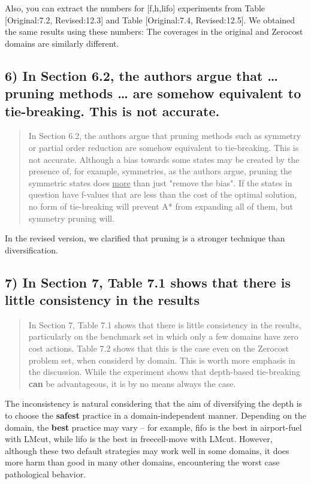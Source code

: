 \documentclass{article}
\begin{document}
Also, you can extract the numbers for [f,h,lifo] experiments from
Table [Original:7.2, Revised:12.3] and Table [Original:7.4, Revised:12.5].
We obtained the same results using these numbers:
The coverages in the original and Zerocost domains are similarly different.

\subsection{6) In Section 6.2, the authors argue that \ldots{} pruning methods \ldots{} are somehow equivalent to tie-breaking. This is not accurate.}
\label{sec:orgheadline31}

\begin{quote}
 In Section 6.2, the authors argue that pruning methods such as
symmetry or partial order reduction are somehow equivalent to
tie-breaking. This is not accurate. Although a bias towards some
states may be created by the presence of, for example, symmetries, as
the authors argue, pruning the symmetric states does \underline{more} than just
"remove the bias". If the states in question have f-values that are
less than the cost of the optimal solution, no form of tie-breaking
will prevent A* from expanding all of them, but symmetry pruning will.
\end{quote}

In the revised version, we clarified that pruning is a stronger technique
than diversification.

\subsection{7) In Section 7, Table 7.1 shows that there is little consistency in the results}
\label{sec:orgheadline32}

\begin{quote}
 In Section 7, Table 7.1 shows that there is little consistency in the
results, particularly on the benchmark set in which only a few domains
have zero cost actions. Table 7.2 shows that this is the case even on
the Zerocost problem set, when considerd by domain. This is worth more
emphasis in the discussion. While the experiment shows that
depth-based tie-breaking \textbf{can} be advantageous, it is by no means
always the case.
\end{quote}

The inconsistency is natural considering
that the aim of diversifying the depth is to choose the \textbf{safest} practice in a domain-independent
manner. Depending on the domain, the \textbf{best} practice may vary -- for example, fifo is the best in
airport-fuel with LMcut, while lifo is the best in freecell-move with LMcut.
However, although these two default strategies may work well in some domains,
it does more harm than good in many other domains,
encountering the worst case pathological behavior.
\end{document}

